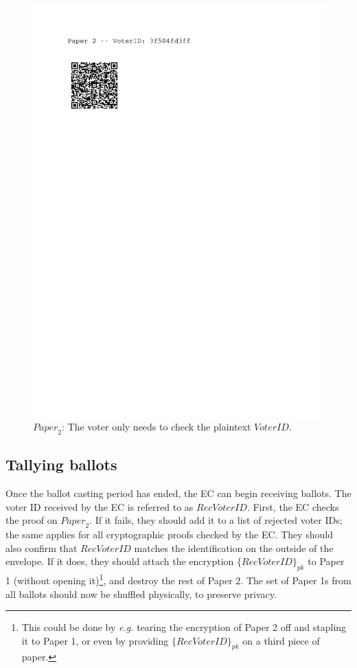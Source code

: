 \documentclass[12pt,a4paper]{article}
\theoremstyle{definition}
\newcommand{\VoterID}{\mathit{VoterID}}
\newcommand{\receivedvid}{\mathit{RecVoterID}}
\newcommand{\Paper}{\mathit{Paper}}
\newcommand{\eg}{\textit{e.g. }}
\begin{document}
\begin{figure}
	\includegraphics[scale=0.6, trim=0cm 22cm 4cm 0cm, clip=true]{paper2.pdf}
	\caption{$\Paper_2$: The voter only needs to check the plaintext $\VoterID$.}
		\label{fig:paper2}
\end{figure}


\subsection{Tallying ballots}
Once the ballot casting period has ended, the EC can begin receiving ballots. The voter ID received by the EC is referred to as $\receivedvid$. First, the EC checks the proof on $\Paper_2$. If it fails, they should add it to a list of rejected voter IDs; the same applies for all cryptographic proofs checked by the EC.
They should also confirm that $\receivedvid$ matches the identification on the outside of the envelope. If it does, they should attach the encryption $\{\receivedvid\}_{pk}$ to Paper 1 (without opening it)\footnote{This could be done by \eg tearing the encryption of Paper 2 off and stapling it to Paper 1, or even by providing $\{\receivedvid\}_{pk}$ on a third piece of paper.}, and destroy the rest of Paper 2. The set of Paper 1s from all ballots should now be shuffled physically, to preserve privacy.
\end{document}
